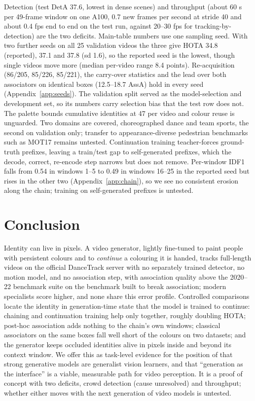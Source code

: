 \documentclass{article} %
\newcommand{\rev}[1]{#1}
\begin{document}
Detection \rev{(test DetA 37.6, lowest in dense scenes)} and throughput (about 60 s per 49-frame window on
one A100, 0.7 new frames per second at stride 40 and about \rev{0.4} fps end to end on the test
run, against 20--30 fps for tracking-by-detection) are the two deficits. \rev{Main-table
numbers use one sampling seed. With two further seeds on all 25 validation videos the three
give HOTA 34.8 (reported), 37.1 and 37.8 (sd 1.6), so the reported seed is the lowest, though single videos move
more (median per-video range 8.4 points). Re-acquisition (86/205, 85/226, 85/221), the
carry-over statistics and the lead over both associators on identical boxes (12.5--18.7
AssA) hold in every seed (Appendix~\ref{app:seeds}).} The validation split served as the model-selection and
development set, so its numbers carry selection bias that the test row does not. The
palette bounds cumulative identities at 47 per video and colour reuse is unguarded. Two
domains are covered, choreographed dance and team sports, the second on validation only;
transfer to appearance-diverse pedestrian benchmarks such as MOT17 remains untested. Continuation training teacher-forces ground-truth prefixes, leaving
a train/test gap to self-generated prefixes\rev{, which the decode, correct, re-encode step
narrows but does not remove. Per-window IDF1 falls from 0.54 in windows 1--5 to 0.49 in
windows 16--25 in the reported seed but rises in the other two (Appendix~\ref{app:chain}),
so we see no consistent erosion along the chain; training on self-generated prefixes is
untested}.

\section{Conclusion}

Identity can live in pixels. A video generator, lightly fine-tuned to paint people with
persistent colours and to \emph{continue} a colouring it is handed, tracks full-length
videos on the official DanceTrack server with no separately trained detector, no motion
model, and no association step, with association quality above the 2020--22 benchmark
suite on the benchmark built to break association; modern specialists score higher, and
none share this error profile. Controlled comparisons locate the identity in
generation-time state \rev{that the model is trained to continue: chaining and
continuation training help only together, roughly doubling HOTA;} post-hoc association adds
nothing to the chain's own windows\rev{;} classical associators
on the same boxes fall well short of the colours on two datasets\rev{;} and the generator keeps
occluded identities alive in pixels inside and beyond its context window. We offer this as
task-level evidence for the position of \citet{gabeur2026imagegen} that strong generative
models are generalist vision learners, and that ``generation as the interface'' is a
viable, measurable path for video perception. \rev{It is a proof of concept with two
deficits, crowd detection (cause unresolved) and throughput; whether either moves with the
next generation of video models is untested.}
\end{document}
